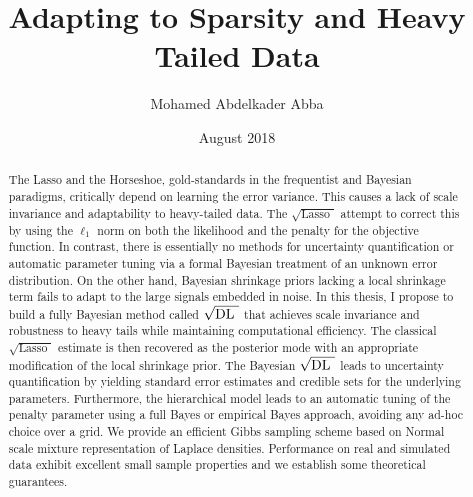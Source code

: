 \documentclass[chapters]{uamaththesis}
\title{Adapting to Sparsity and Heavy Tailed Data}
\author{Mohamed Abdelkader Abba}
\date{August 2018}
\def\sql{$\sqrt{\text{Lasso }}$}
\def\sqdl{$\sqrt{\text{\rm{DL} }}$}
\begin{document}
\frontmatter
\maketitle

\raggedright
\parindent 20pt



\begin{abstract}

The Lasso and the Horseshoe, gold-standards in the frequentist and Bayesian paradigms, critically depend on learning the error variance. This causes a lack of scale invariance and adaptability to heavy-tailed data. The \sql{} \citep{belloni2011square} attempt to correct this by using the $\ell_1$ norm on both the likelihood and the penalty for the objective function. In contrast, there is essentially no methods for uncertainty quantification or automatic parameter tuning via a formal Bayesian treatment of an unknown error distribution. On the other hand, Bayesian shrinkage priors lacking a local shrinkage term fails to adapt to the large signals embedded in noise. In this thesis, I propose to build a fully Bayesian method called \sqdl{} that achieves scale invariance and robustness to heavy tails while maintaining computational efficiency. 
The classical \sql{} estimate is then recovered as the posterior mode with an appropriate modification of the local shrinkage prior. The Bayesian \sqdl{} leads to uncertainty quantification by yielding standard error estimates and credible sets for the underlying parameters. Furthermore, the hierarchical model leads to an automatic tuning of the penalty parameter using a full Bayes or empirical Bayes approach, avoiding any ad-hoc choice over a grid. We provide an efficient Gibbs sampling scheme based on Normal scale mixture representation of Laplace densities. Performance on real and simulated data exhibit excellent small sample properties and we establish some theoretical guarantees. 
\end{abstract}
\end{document}
